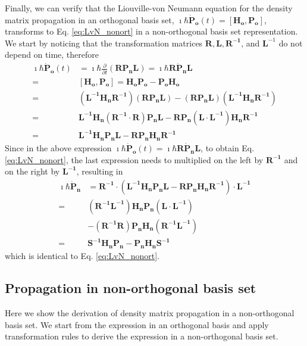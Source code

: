 \documentclass[journal=jctcce,manuscript=article,etalmode=truncate,maxauthors=10,layout=twocolumn,9pt]{achemso}   %
\begin{document}
Finally, we can  verify  that  the  Liouville-von Neumann  equation   for the density matrix propagation  
in an orthogonal basis set, 
$\imath \hbar {\mathbf{ \dot P_o}} (t) = [\mathbf{ H_o, P_o}]$, 
transforms  to   Eq. \ref{eq:LvN_nonort} 
in a non-orthogonal basis set representation.
We start by noticing that the transformation matrices $\mathbf{ R, L, R^{-1}}$, and $\mathbf L^{-1}$
 do not depend on time, therefore
\begin{align}
\nonumber
\imath \hbar {\mathbf{ \dot P_o}} (t) &=  \imath \hbar  \frac{\partial}{\partial t} ( \mathbf{  RP_n L})
  =\imath \hbar  \mathbf{ R \dot P_n L}   \\
\nonumber  = & [\mathbf{ H_o, P_o}] = \mathbf{ H_o P_o}  - \mathbf{ P_o H_o}  \\
\nonumber  =&  \mathbf{ (L^{-1} H_n R^{-1} )( R P_n L ) }  - \mathbf{ (R P_n L)( L^{-1} H_n R^{-1}) } \\
\nonumber  =&  \mathbf{ L^{-1} H_n (R^{-1}\cdot R) P_n L  }  - \mathbf{ R P_n (L\cdot L^{-1}) H_n R^{-1} } \\
  =&  \mathbf{ L^{-1} H_n  P_n L  }  - \mathbf{ R P_n  H_n R^{-1} } 
\end{align}
Since in the above expression  $\imath \hbar {\mathbf{ \dot P_o}} (t)= \imath \hbar  \mathbf{ R \dot P_n L}$, 
 to obtain   Eq.  \ref{eq:LvN_nonort},    the last expression needs to multiplied  on the left 
by $\mathbf{ R^{-1}}$  and  on the right  by $\mathbf{ L^{-1}}$, resulting in
\begin{align}
\nonumber
\imath \hbar {\mathbf{ \dot P_n}}  
&= \mathbf{ R^{-1}} \cdot (\mathbf{ L^{-1} H_n P_n L} - \mathbf{ R P_n H_n R^{-1}}) \cdot \mathbf{L^{-1}} \\
\nonumber =& \mathbf{( R^{-1} L^{-1} ) H_n P_n (L \cdot L^{-1})}  \\
\nonumber  & - \mathbf{(R^{-1} R) P_n H_n (R^{-1} L^{-1}) }     \\
=&  \mathbf{ S^{-1}  H_n P_n   - P_n H_n   S^{-1} }
\label{eq:LvN_nonort-Appendix}
\end{align}
which is identical to  Eq.  \ref{eq:LvN_nonort}.



\subsection{ Propagation  in non-orthogonal  basis set }

 Here we show the derivation of density matrix  propagation in a non-orthogonal  basis set.
We start  from the expression   in an orthogonal basis and  apply  transformation rules  to
derive the expression in a non-orthogonal basis set.
\end{document}
